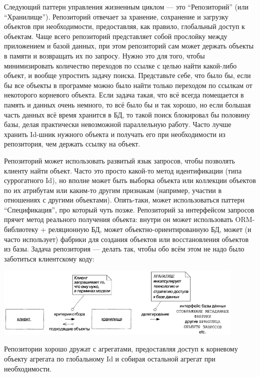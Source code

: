 \documentclass[a5paper]{article}
\begin{document}
Следующий паттерн управления жизненным циклом --- это ``Репозиторий'' (или ``Хранилище''). Репозиторий отвечает за хранение, сохранение и загрузку объектов при необходимости, предоставляя, как правило, глобальный доступ к объектам. Чаще всего репозиторий представляет собой прослойку между приложением и базой данных, при этом репозиторий сам может держать объекты в памяти и возвращать их по запросу. Нужно это для того, чтобы минимизировать количество переходов по ссылке с целью найти какой-либо объект, и вообще упростить задачу поиска. Представьте себе, что было бы, если бы все объекты в программе можно было найти только переходом по ссылкам от некоторого корневого объекта. Если задача такая, что всё всегда помещается в память и данных очень немного, то всё было бы и так хорошо, но если большая часть данных всё время хранится в БД, то такой поиск блокировал бы половину базы, делая практически невозможной параллельную работу. Часто лучше хранить Id-шник нужного объекта и получать его при необходимости из репозитория, чем держать ссылку на объект.

Репозиторий может использовать развитый язык запросов, чтобы позволять клиенту найти объект. Часто это просто какой-то метод идентификации (типа суррогатного Id), но вполне может быть выборка объекта или коллекции объектов по их атрибутам или каким-то другим признакам (например, участии в отношениях с другими объектами). Опять-таки, может использоваться паттерн ``Спецификация'', про который чуть позже. Репозиторий за интерфейсом запросов прячет метод реального получения объекта: внутри он может использовать ORM-библиотеку + реляционную БД, может объектно-ориентированную БД, может (и часто использует) фабрики для создания объектов или восстановления объектов из базы. Задача репозитория --- делать так, чтобы обо всём этом не надо было заботиться клиентскому коду:

\begin{center}
    \includegraphics[width=0.9\textwidth]{repository.png}
\end{center}

Репозитории хорошо дружат с агрегатами, предоставляя доступ к корневому объекту агрегата по глобальному Id и собирая остальной агрегат при необходимости. 
\end{document}
